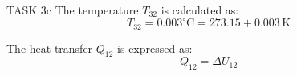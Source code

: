 TASK 3c  
The temperature \( T_{32} \) is calculated as:  
\[
T_{32} = 0.003^\circ\text{C} = 273.15 + 0.003 \, \text{K}
\]

The heat transfer \( Q_{12} \) is expressed as:  
\[
Q_{12} = \Delta U_{12}
\]